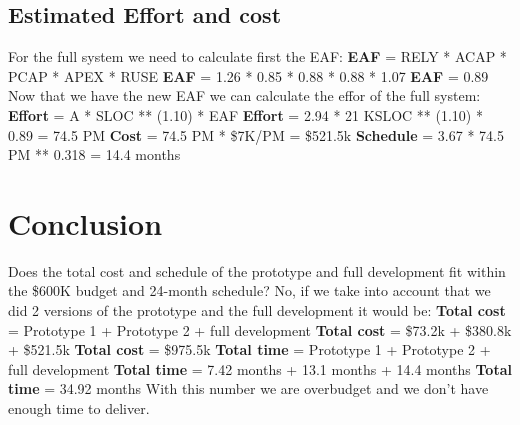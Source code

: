 \subsection{Estimated Effort and cost}
For the full system we need to calculate first the EAF:\newline\newline
\textbf{EAF} = RELY * ACAP * PCAP * APEX * RUSE \newline
\textbf{EAF} = 1.26 * 0.85 * 0.88 * 0.88 * 1.07 \newline
\textbf{EAF} = 0.89\newline\newline
\noindent
Now that we have the new EAF we can calculate the effor of the full system:\newline\newline
\textbf{Effort} = A * SLOC ** (1.10) * EAF \newline
\textbf{Effort} = 2.94 * 21 KSLOC ** (1.10) * 0.89 = 74.5 PM \newline\newline
\textbf{Cost} = 74.5 PM * \$7K/PM = \$521.5k\newline\newline
\textbf{Schedule} = 3.67 * 74.5 PM ** 0.318 = 14.4 months\newline\newline
\pagebreak
\section{Conclusion}
Does the total cost and schedule of the prototype and full development fit within the  \$600K budget and 24-month schedule?\newline\newline
\noindent
No, if we take into account that we did 2 versions of the prototype and the full development it would be: \newline\newline
\textbf{Total cost} = Prototype 1 + Prototype 2 + full development \newline
\textbf{Total cost} = \$73.2k + \$380.8k + \$521.5k\newline
\textbf{Total cost} = \$975.5k\newline\newline
\noindent
\textbf{Total time} = Prototype 1 + Prototype 2 + full development \newline
\textbf{Total time} = 7.42 months + 13.1 months + 14.4 months\newline
\textbf{Total time} = 34.92 months\newline\newline
\noindent
With this number we are overbudget and we don't have enough time to deliver.